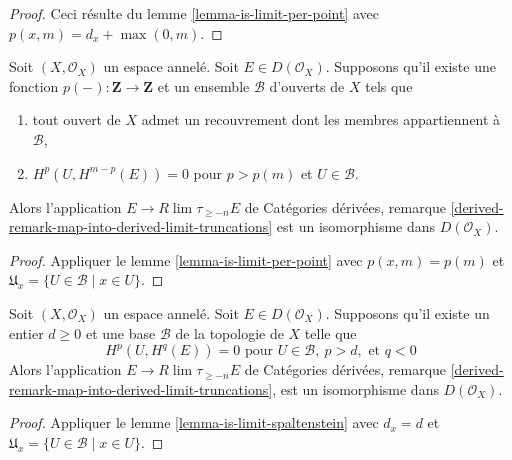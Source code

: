 \begin{proof}
Ceci résulte du lemme \ref{lemma-is-limit-per-point} avec $p(x, m) = d_x + \max(0, m)$.
\end{proof}

\begin{lemma}

\label{lemma-is-limit}

Soit $(X, \mathcal{O}_X)$ un espace annelé. Soit $E \in D(\mathcal{O}_X)$. Supposons qu'il existe une fonction $p(-) : \mathbf{Z} \to \mathbf{Z}$
et un ensemble $\mathcal{B}$ d'ouverts de $X$ tels que

\begin{enumerate}

\item tout ouvert de $X$ admet un recouvrement dont les membres appartiennent à $\mathcal{B}$,
\item  $H^p(U, H^{m - p}(E)) = 0$ pour $p > p(m)$ et $U \in \mathcal{B}$.

\end{enumerate}

Alors l'application $E \to R\lim \tau_{\geq -n} E$ de Catégories dérivées, remarque
\ref{derived-remark-map-into-derived-limit-truncations}
est un isomorphisme dans $D(\mathcal{O}_X)$.

\end{lemma}

\begin{proof}
Appliquer le lemme \ref{lemma-is-limit-per-point} avec $p(x, m) = p(m)$ et $\mathfrak{U}_x = \{U \in \mathcal{B} \mid x \in U\}$.
\end{proof}

\begin{lemma}

\label{lemma-is-limit-dimension}
Soit $(X, \mathcal{O}_X)$ un espace annelé. Soit $E \in D(\mathcal{O}_X)$. Supposons qu'il existe un entier $d \geq 0$ et une base $\mathcal{B}$ de la topologie de $X$ telle que $$
H^p(U, H^q(E)) = 0 \text{ pour }
U \in \mathcal{B},\ p > d, \text{ et }q < 0
$$ Alors l'application $E \to R\lim \tau_{\geq -n} E$ de Catégories dérivées, remarque \ref{derived-remark-map-into-derived-limit-truncations}, est un isomorphisme dans $D(\mathcal{O}_X)$.
\end{lemma}

\begin{proof}
Appliquer le lemme \ref{lemma-is-limit-spaltenstein} avec $d_x = d$ et $\mathfrak{U}_x = \{U \in \mathcal{B} \mid x \in U\}$.
\end{proof}

